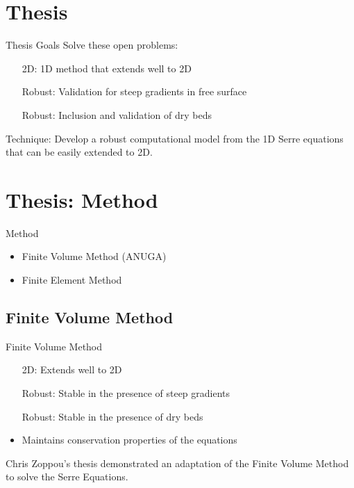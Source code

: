 \documentclass[]{beamer}
\begin{document}
\section{Thesis}

\begin{frame}{Thesis Goals}
	Solve these open problems:
	\begin{itemize}
		\item[2D:] 1D method that extends well to 2D
		\item[Robust:] Validation for steep gradients in free surface
		\item[Robust:] Inclusion and validation of dry beds
	\end{itemize}		
	\medskip
	\pause
	Technique: Develop a robust computational model from the 1D Serre equations that can be easily extended to 2D. 
\end{frame}

\section{Thesis: Method}
\begin{frame}{Method}
	\begin{itemize}
		\item Finite Volume Method (ANUGA)
		\item Finite Element Method
	\end{itemize}
\end{frame}
\subsection{Finite Volume Method}
\begin{frame}{Finite Volume Method}
\begin{itemize}
	\item[2D:] Extends well to 2D
	\item[Robust:] Stable in the presence of steep gradients
	\item[Robust:] Stable in the presence of dry beds
	\item Maintains conservation properties of the equations
\end{itemize}
\pause  Chris Zoppou's thesis demonstrated an adaptation of the Finite Volume Method to solve the Serre Equations.
\end{frame}
\end{document}

